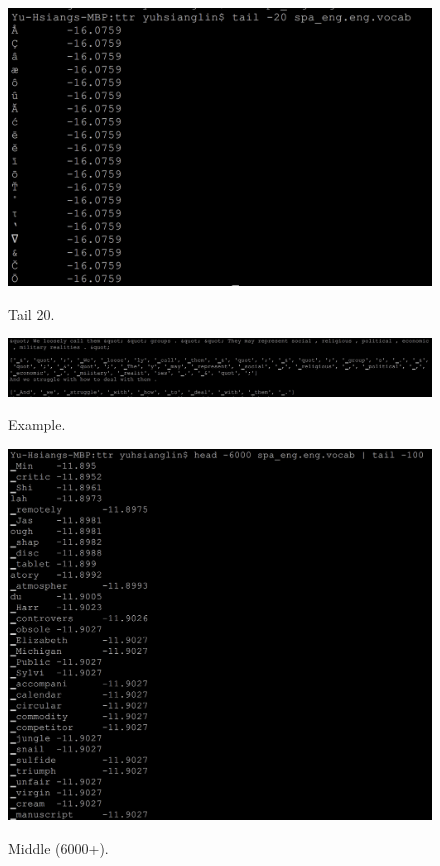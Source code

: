 \documentclass{article}
\begin{document}
\begin{figure}
\center
\includegraphics[width=12cm]{vocab2.png}\\
\caption{Tail 20.}
\end{figure}

\begin{figure}
\center
\includegraphics[width=16cm]{ex1.png}\\
\caption{Example.}
\end{figure}

\begin{figure}
\center
\includegraphics[width=12cm]{vocab3.png}\\
\caption{Middle (6000+).}
\end{figure}
\end{document}
